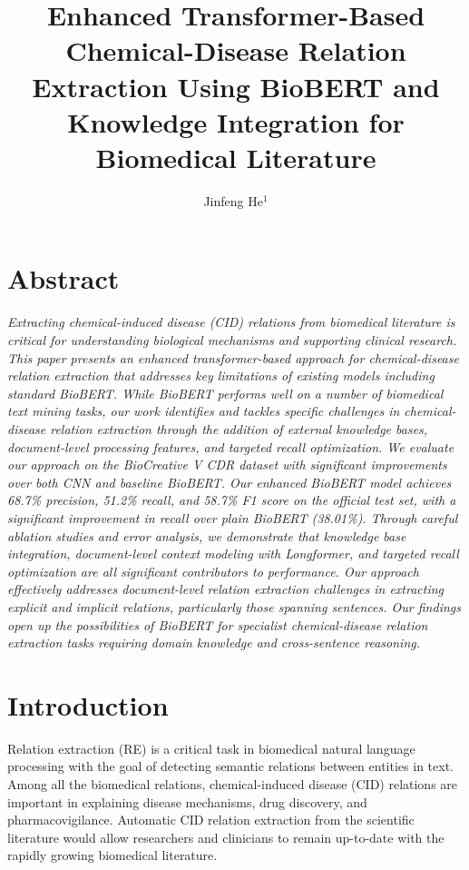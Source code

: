 \documentclass{amia}
\begin{document}
\title{Enhanced Transformer-Based Chemical-Disease Relation Extraction Using BioBERT and Knowledge Integration for Biomedical Literature}

\author{Jinfeng He$^1$}


\maketitle

\section*{Abstract}

\textit{Extracting chemical-induced disease (CID) relations from biomedical literature is critical   for understanding biological mechanisms and supporting clinical research. This paper presents an enhanced transformer-based approach for chemical-disease relation extraction that addresses key limitations of existing models   including standard BioBERT. While BioBERT performs well on a number of biomedical text mining tasks, our work identifies and tackles specific challenges in chemical-disease relation extraction through the addition of external knowledge bases, document-level processing features, and targeted recall optimization. We evaluate our approach on the BioCreative V CDR dataset with significant improvements over both CNN and baseline BioBERT. Our enhanced BioBERT model achieves 68.7\% precision, 51.2\% recall, and 58.7\% F1 score on the official test set, with a significant improvement in recall over plain BioBERT (38.01\%). Through careful ablation studies and error analysis, we demonstrate that knowledge base integration, document-level context modeling with Longformer, and targeted recall optimization are all significant contributors to performance. Our approach effectively addresses document-level relation extraction challenges in extracting explicit and implicit relations, particularly those spanning sentences. Our findings open up the possibilities of BioBERT for specialist chemical-disease relation extraction tasks requiring domain knowledge and cross-sentence reasoning.}

\section*{Introduction}

Relation extraction (RE) is a critical task in biomedical natural language processing with the goal of detecting semantic relations between entities in text. Among all the biomedical relations, chemical-induced disease (CID) relations are important in explaining disease mechanisms, drug discovery, and pharmacovigilance. Automatic CID relation extraction from the scientific literature would allow researchers and clinicians to remain up-to-date with the rapidly growing biomedical literature.
\end{document}
